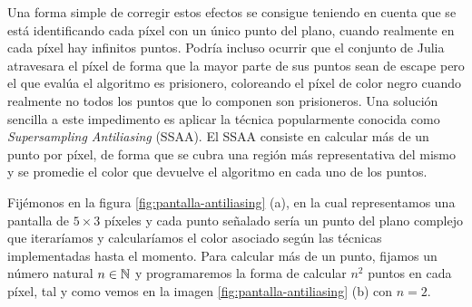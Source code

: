 Una forma simple de corregir estos efectos se consigue teniendo en cuenta que se está identificando cada píxel con un único punto del plano, cuando realmente en cada píxel hay infinitos puntos. Podría incluso ocurrir que el conjunto de Julia atravesara el píxel de forma que la mayor parte de sus puntos sean de escape pero el que evalúa el algoritmo es prisionero, coloreando el píxel de color negro cuando realmente no todos los puntos que lo componen son prisioneros. Una solución sencilla a este impedimento es aplicar la técnica popularmente conocida como \textit{Supersampling Antiliasing} (SSAA). El SSAA consiste en calcular más de un punto por píxel, de forma que se cubra una región más representativa del mismo y se promedie el color que devuelve el algoritmo en cada uno de los puntos.

Fijémonos en la figura \ref{fig:pantalla-antiliasing} (a), en la cual representamos una pantalla de $5\times 3$ píxeles y cada punto señalado sería un punto del plano complejo que iteraríamos y calcularíamos el color asociado según las técnicas implementadas hasta el momento. Para calcular más de un punto, fijamos un número natural $n\in\mathbb{N}$ y programaremos la forma de calcular $n^2$ puntos en cada píxel, tal y como vemos en la imagen \ref{fig:pantalla-antiliasing} (b) con $n=2$.

